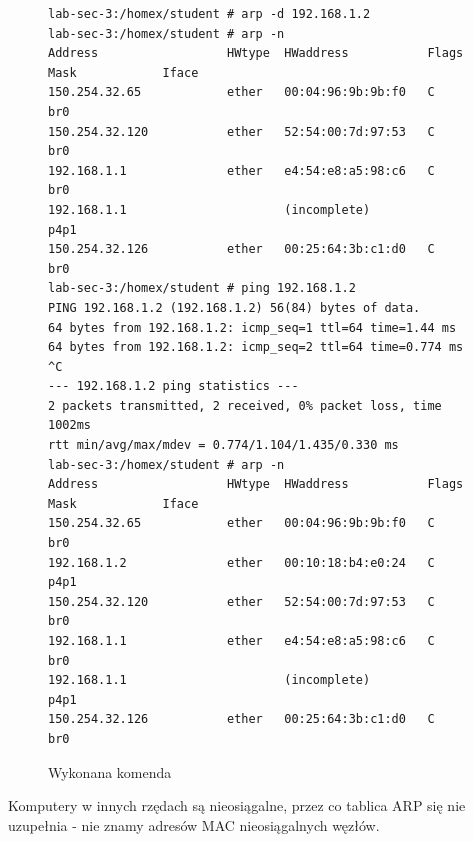 \documentclass[polish, a4paper]{article}
\begin{document}
\begin{figure}[H]
\begin{verbatim}
lab-sec-3:/homex/student # arp -d 192.168.1.2
lab-sec-3:/homex/student # arp -n
Address                  HWtype  HWaddress           Flags Mask            Iface
150.254.32.65            ether   00:04:96:9b:9b:f0   C                     br0
150.254.32.120           ether   52:54:00:7d:97:53   C                     br0
192.168.1.1              ether   e4:54:e8:a5:98:c6   C                     br0
192.168.1.1                      (incomplete)                              p4p1
150.254.32.126           ether   00:25:64:3b:c1:d0   C                     br0
lab-sec-3:/homex/student # ping 192.168.1.2
PING 192.168.1.2 (192.168.1.2) 56(84) bytes of data.
64 bytes from 192.168.1.2: icmp_seq=1 ttl=64 time=1.44 ms
64 bytes from 192.168.1.2: icmp_seq=2 ttl=64 time=0.774 ms
^C
--- 192.168.1.2 ping statistics ---
2 packets transmitted, 2 received, 0% packet loss, time 1002ms
rtt min/avg/max/mdev = 0.774/1.104/1.435/0.330 ms
lab-sec-3:/homex/student # arp -n
Address                  HWtype  HWaddress           Flags Mask            Iface
150.254.32.65            ether   00:04:96:9b:9b:f0   C                     br0
192.168.1.2              ether   00:10:18:b4:e0:24   C                     p4p1
150.254.32.120           ether   52:54:00:7d:97:53   C                     br0
192.168.1.1              ether   e4:54:e8:a5:98:c6   C                     br0
192.168.1.1                      (incomplete)                              p4p1
150.254.32.126           ether   00:25:64:3b:c1:d0   C                     br0
\end{verbatim}
\caption{Wykonana komenda}
\end{figure}

Komputery w innych rzędach są nieosiągalne, przez co tablica ARP się nie uzupełnia - nie znamy adresów MAC nieosiągalnych węzłów.
\end{document}
